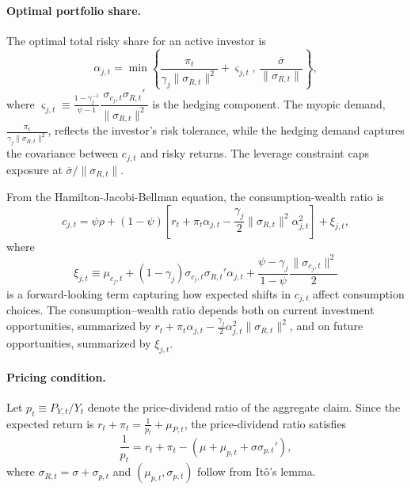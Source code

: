 \documentclass[12pt,english]{article}
\begin{document}
\paragraph{Optimal portfolio share.}
The optimal total risky share for an active investor is
\begin{equation}\label{eq:portfolio_share}
    \alpha_{j,t} = \min \left\{ 
        \frac{\pi_t}{\gamma_j \|\sigma_{R,t}\|^2} + \varsigma_{j,t}, \,
        \frac{\overline{\sigma}}{\|\sigma_{R,t}\|} 
    \right\},
\end{equation}
where $\varsigma_{j,t} \equiv \frac{1-\gamma_j^{-1}}{\psi-1} 
\dfrac{\sigma_{c_j,t} \sigma_{R,t}'}{\|\sigma_{R,t}\|^2}$ is the hedging component. The myopic demand, $\frac{\pi_t}{\gamma_j \|\sigma_{R,t}\|^2}$, reflects the investor's risk tolerance, while the hedging demand captures the covariance between $c_{j,t}$ and risky returns. The leverage constraint caps exposure at $\overline{\sigma}/\|\sigma_{R,t}\|$.

From the Hamilton-Jacobi-Bellman equation, the consumption-wealth ratio is
\begin{equation}\label{eq:xi_j}
    c_{j,t} = \psi \rho 
    + (1-\psi) \left[ r_t + \pi_t \alpha_{j,t} 
        - \frac{\gamma_j}{2} \|\sigma_{R,t}\|^2 \alpha_{j,t}^2 \right] 
    + \xi_{j,t},
\end{equation}
where 
\[
    \xi_{j,t} \equiv \mu_{c_j,t} 
    + (1-\gamma_j) \sigma_{c_j,t} \sigma_{R,t}' \alpha_{j,t} 
    + \frac{\psi - \gamma_j}{1-\psi} \frac{\|\sigma_{c_j,t}\|^2}{2}
\]
is a forward-looking term capturing how expected shifts in $c_{j,t}$ affect consumption choices.
The consumption--wealth ratio depends both on current investment opportunities, summarized by $r_t + \pi_t \alpha_{j,t} - \frac{\gamma_j}{2} \alpha_{j,t}^2 \|\sigma_{R,t}\|^2$, and on future opportunities, summarized by $\xi_{j,t}$. 

\paragraph{Pricing condition.} 

Let $p_t \equiv P_{Y,t}/Y_t$ denote the price-dividend ratio of the aggregate claim. Since the expected return is $r_t + \pi_t = \frac{1}{p_t} + \mu_{P,t}$, the price-dividend ratio satisfies
\begin{equation}\label{eq:pricing_cond}
    \frac{1}{p_t} = r_t + \pi_t - (\mu + \mu_{p,t} + \sigma \sigma_{p,t}'),
\end{equation}
where $\sigma_{R,t} = \sigma + \sigma_{p,t}$ and $(\mu_{p,t},\sigma_{p,t})$ follow from It\^{o}'s lemma.
\end{document}
